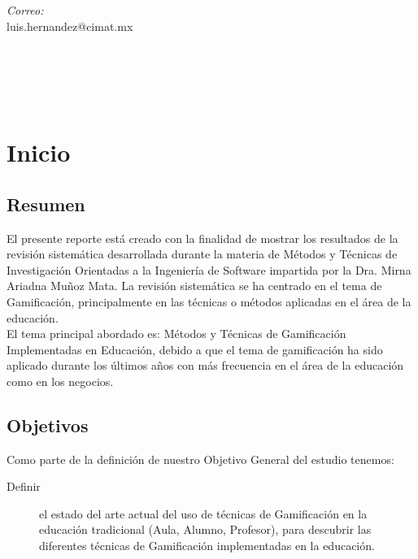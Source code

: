 \documentclass{report}
\makeatletter
\let\thedate\@date
\makeatother
\begin{document}
\begin{titlepage}
	\begin{minipage}{0.5\textwidth}
		\begin{flushleft} \large
			\emph{Correo:}\\
			luis.hernandez@cimat.mx
		\end{flushleft}
	\end{minipage}~
	\begin{minipage}{0.4\textwidth}
		\begin{flushright} \large
		\end{flushright}
	\end{minipage}\\[2 cm]
		
	{\large \thedate}\\[2 cm]
 
	\vfill
	
\end{titlepage}


\tableofcontents
\pagebreak

\chapter{Inicio}
    
    \section{Resumen}
    El presente reporte está creado con la finalidad de mostrar los resultados de la revisión sistemática desarrollada durante la materia de Métodos y Técnicas de Investigación Orientadas a la Ingeniería de Software impartida por la Dra. Mirna Ariadna Muñoz Mata. La revisión sistemática se ha centrado en el tema de Gamificación, principalmente en las técnicas o métodos aplicadas en el área de la educación.\\
    El tema principal abordado es: Métodos y Técnicas de Gamificación Implementadas en Educación, debido a que el tema de gamificación ha sido aplicado durante los últimos años con más frecuencia en el área de la educación como en los negocios.\\
    
    \section{Objetivos}
    	Como parte de la definición de nuestro Objetivo General del estudio tenemos:
    	\begin{description}
    		\item[Definir] el estado del arte actual del uso de técnicas de Gamificación en la educación tradicional (Aula, Alumno, Profesor), para descubrir las diferentes técnicas de Gamificación implementadas en la educación.
    	\end{description}
    	
\end{document}
